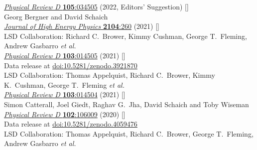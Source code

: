 \begin{spacelist}
\begin{revnumerate}
      \href{https://doi.org/10.1103/PhysRevD.105.034505}{\textit{Physical Review D} \textbf{105}:034505} (2022, Editors' Suggestion) []
    \pagebreakitem
       \\
      Georg Bergner and David Schaich \\
      \href{https://doi.org/10.1007/JHEP04(2021)260}{\textit{Journal of High Energy Physics} \textbf{2104}:260} (2021) []
    \pagebreakitem
       \\
      LSD Collaboration: Richard C.~Brower, Kimmy Cushman, George T.~Fleming, Andrew Gasbarro \textit{et al.} \\ %
      \href{https://doi.org/10.1103/PhysRevD.103.014505}{\textit{Physical Review D} \textbf{103}:014505} (2021) [] \\
      Data release at \href{https://doi.org/10.5281/zenodo.3921870}{doi:10.5281/zenodo.3921870}
    \pagebreakitem
       \\
      LSD Collaboration: Thomas Appelquist, Richard C.~Brower, Kimmy K.~Cushman, George T.~Fleming \textit{et al.} \\ %
      \href{https://doi.org/10.1103/PhysRevD.103.014504}{\textit{Physical Review D} \textbf{103}:014504} (2021) []
    \pagebreakitem
       \\
      Simon Catterall, Joel Giedt, Raghav G.~Jha, David Schaich and Toby Wiseman \\
      \href{https://doi.org/10.1103/PhysRevD.102.106009}{\textit{Physical Review D} \textbf{102}:106009} (2020) [] \\
      Data release at \href{https://doi.org/10.5281/zenodo.4059476}{doi:10.5281/zenodo.4059476}
    \pagebreakitem
       \\
      LSD Collaboration: Thomas Appelquist, Richard C.~Brower, George T.~Fleming, Andrew Gasbarro \textit{et al.} \\ %

\end{revnumerate}
\end{spacelist}
